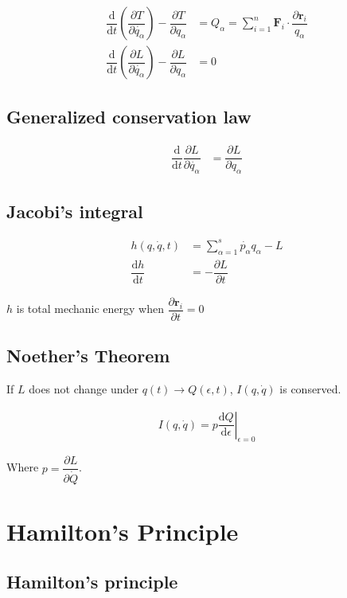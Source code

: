 \documentclass[10pt, a4paper]{article}
\def\D{\partial}
\begin{document}
\begin{multicols}{2}
\begin{align}
	\dfrac{\mathrm{d}}{\mathrm{d}t} \left(\dfrac{\D T}{\D \dot{q_\alpha}}\right) - \dfrac{\D T}{\D q_\alpha} &= Q_\alpha = \sum^n_{i = 1} \bm{F}_i \cdot \dfrac{\D \bm{r}_i}{q_\alpha}\\
	\dfrac{\mathrm{d}}{\mathrm{d}t} \left(\dfrac{\D L}{\D \dot{q_\alpha}}\right) - \dfrac{\D L}{\D q_\alpha} &= 0
\end{align}

\subsection{Generalized conservation law }

	\begin{align}
			\dfrac{\mathrm{d}}{\mathrm{d}t} \dfrac{\D L}{\D \dot{q_\alpha}}   &= \dfrac{\D L}{\D q_\alpha}
	\end{align}

\subsection{Jacobi's integral}

	\begin{align}
		h(q, \dot{q}, t) &= \sum^s_{\alpha = 1} \dot{p_\alpha} q_\alpha - L\\
		\dfrac{\mathrm{d} h}{\mathrm{d} t} &= - \dfrac{\D L}{\D t}
	\end{align}

$ h $ is total mechanic energy when
$ \dfrac{\D \bm{r}_i}{\D t} = 0 $

\subsection{Noether's Theorem}

If $L$ does not change under $q(t) \rightarrow Q(\epsilon, t)$, $I(q, \dot{q})$ is conserved.

	\begin{align}
		I(q, \dot{q}) = \left.p\dfrac{\mathrm{d} Q}{\mathrm{d} \epsilon}\right|_{\epsilon = 0}
	\end{align}

Where $p = \dfrac{\D L}{\D \dot{Q}}$.

\section{Hamilton's Principle}

\subsection{Hamilton's principle}


\end{multicols}
\end{document}
